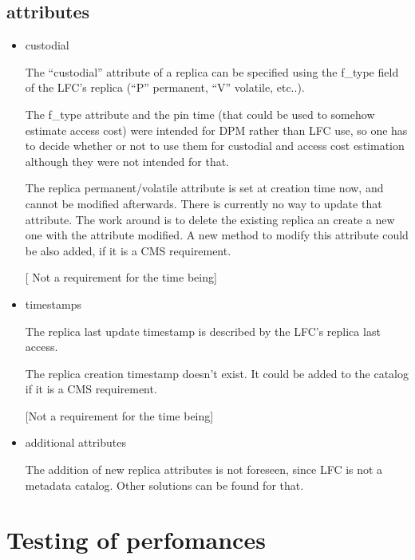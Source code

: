 \documentclass[pdftex]{cmspaper}
\begin{document}
\subsection{attributes}
 \begin{itemize}
  \item custodial

The ``custodial'' attribute of a replica can be specified using the
f\_type field of the LFC's replica (``P'' permanent, ``V'' volatile, etc..).

The f\_type attribute and the pin time (that could be used to somehow estimate access cost) were intended for DPM rather than LFC use, so one has to decide
whether or not to use them for custodial and access cost estimation 
although they were not intended for that.

The replica permanent/volatile attribute is set at creation time now,
and cannot be modified afterwards. There is currently no way to update that
attribute.
The work around is to delete the existing replica an create a new one with 
the attribute modified. 
A new method to modify this attribute could be also added, if it is a CMS requirement.

[ Not a requirement for the time being]


  \item timestamps

The replica last update timestamp is described by the LFC's replica last access.

The replica creation timestamp doesn't exist. It could be added to the catalog if it is a CMS requirement.

[Not a requirement for the time being]

  \item additional attributes

The addition of new replica attributes is not foreseen, since LFC is not a metadata catalog. 
Other solutions can be found for that.                                                     

 \end{itemize}


\section{Testing of perfomances}
\end{document}
